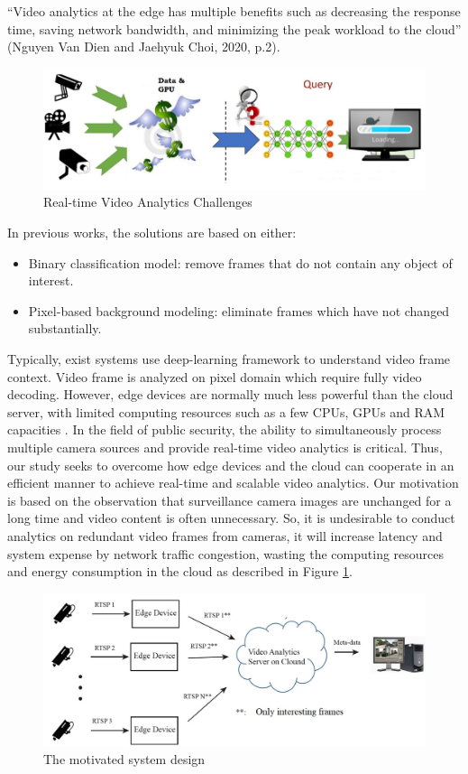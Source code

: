 “Video analytics at the edge has multiple benefits such as decreasing the response time, saving network bandwidth, and minimizing the peak workload to the cloud” (Nguyen Van Dien and Jaehyuk Choi, 2020, p.2). 
\begin{figure}
\centering
 \includegraphics[width=1.0\linewidth]{Figures/vachallenge.png}
 \caption{Real-time Video Analytics Challenges}
 \label{fig:chal}
\end{figure}
In previous works, the solutions are based on either:
\begin{itemize}
\item Binary classification model\cite{canel2019scaling}\cite{kang2017noscope}: remove frames that do not contain any object of interest.
\item Pixel-based background modeling\cite{chen2015glimpse}: eliminate frames which have not changed substantially.
\end{itemize}
Typically, exist systems use deep-learning framework to understand video frame context. Video frame is analyzed on pixel domain which require fully video decoding. However, edge devices are normally much less powerful than the cloud server, with limited computing resources such as a few CPUs, GPUs and RAM capacities \cite{stone2019towards}. In the field of public security, the ability to simultaneously process multiple camera sources and provide real-time video analytics is critical. Thus, our study seeks to overcome how edge devices and the cloud can cooperate in an efficient manner to achieve real-time and scalable video analytics. Our motivation is based on the observation that surveillance camera images are unchanged for a long time and video content is often unnecessary. So, it is undesirable to conduct analytics on redundant video frames from cameras, it will increase latency and system expense by network traffic congestion, wasting the computing resources and energy consumption in the cloud as described in Figure \ref{fig:chal}. \\
\begin{figure}
\centering
 \includegraphics[width=1.0\linewidth]{Figures/motivation.jpg}
 \caption{The motivated system design}
 \label{fig:mot}
\end{figure}
